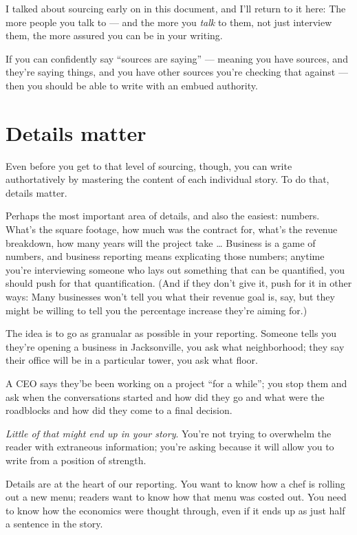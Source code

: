 \documentclass[
  12pt,
  american,
  letterpaperpaper,
  extrafontsizes,onecolumn,openright
  ]{memoir}
\begin{document}
I talked about sourcing early on in this document, and I'll return to it here: The more people you talk to --- and the more you \emph{talk} to them, not just interview them, the more assured you can be in your writing.

If you can confidently say \enquote{sources are saying} --- meaning you have sources, and they're saying things, and you have other sources you're checking that against --- then you should be able to write with an embued authority.

\hypertarget{details-matter}{%
\section*{Details matter}\label{details-matter}}

Even before you get to that level of sourcing, though, you can write authortatively by mastering the content of each individual story. To do that, details matter.

Perhaps the most important area of details, and also the easiest: numbers. What's the square footage, how much was the contract for, what's the revenue breakdown, how many years will the project take \ldots{} Business is a game of numbers, and business reporting means explicating those numbers; anytime you're interviewing someone who lays out something that can be quantified, you should push for that quantification. (And if they don't give it, push for it in other ways: Many businesses won't tell you what their revenue goal is, say, but they might be willing to tell you the percentage increase they're aiming for.)

The idea is to go as granualar as possible in your reporting. Someone tells you they're opening a business in Jacksonville, you ask what neighborhood; they say their office will be in a particular tower, you ask what floor.

A CEO says they'be been working on a project \enquote{for a while}; you stop them and ask when the conversations started and how did they go and what were the roadblocks and how did they come to a final decision.

\emph{Little of that might end up in your story}. You're not trying to overwhelm the reader with extraneous information; you're asking because it will allow you to write from a position of strength.

Details are at the heart of our reporting. You want to know how a chef is rolling out a new menu; readers want to know how that menu was costed out. You need to know how the economics were thought through, even if it ends up as just half a sentence in the story.
\end{document}
